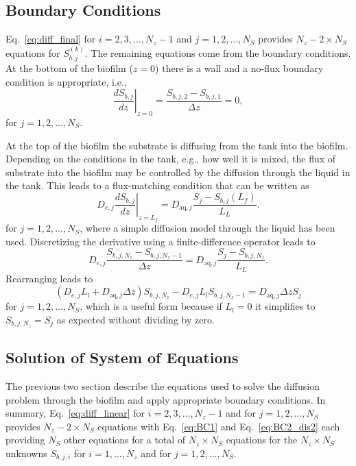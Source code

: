\documentclass[letterpaper, twoside]{article}
\numberwithin{equation}{section}
\newcommand{\eg}{e.g.}
\newcommand{\ie}{i.e.}
\begin{document}
\subsection{Boundary Conditions} \label{Boundary Conditions}
Eq.~\ref{eq:diff_final} for $i=2,3,\dots,N_z-1$ and $j=1,2,\dots,N_S$ provides $N_z-2 \times N_S$ equations for $S_{b,j}^{(k)}$.  The remaining equations come from the boundary conditions.  At the bottom of the biofilm ($z=0$) there is a wall and a no-flux boundary condition is appropriate, \ie,
\begin{equation}
  \label{eq:BC1}
  \left.\frac{d S_{b,j}}{dz}\right|_{z=0}= \frac{S_{b,j,2} - S_{b,j,1}}{\Delta z} =0,
\end{equation}
for $j=1,2,\dots,N_S$.

At the top of the biofilm the substrate is diffusing from the tank into the biofilm.  Depending on the conditions in the tank, \eg, how well it is mixed, the flux of substrate into the biofilm may be controlled by the diffusion through the liquid in the tank.  This leads to a flux-matching condition that can be written as
\begin{equation}
  \label{eq:BC2}
  D_{e,j} \left.\frac{d S_{b,j}}{dz}\right|_{z=L_f} = D_{\mathrm{aq},j} \frac{S_j - S_{b,j}(L_f)}{L_L}.
\end{equation}
for $j=1,2,\dots,N_S$, where a simple diffusion model through the liquid has been used.  Discretizing the derivative using a finite-difference operator leads to
\begin{equation}
  \label{eq:BC2_dis}
  D_{e,j} \frac{S_{b,j,N_z} - S_{b,j,N_z-1}}{\Delta z} = D_{\mathrm{aq},j} \frac{S_j - S_{b,j,N_z}}{L_L}.
\end{equation}
Rearranging leads to
\begin{equation}
  \label{eq:BC2_dis2}
  \left(D_{e,j} L_l + D_{\mathrm{aq},j} \Delta z\right) S_{b,j,N_z} - D_{e,j} L_l S_{b,j,N_z-1} = D_{\mathrm{aq},j} \Delta z S_j
\end{equation}
for $j=1,2,\dots,N_S$, which is a useful form because if $L_l=0$ it simplifies to $S_{b,j, N_z}=S_j$ as expected without dividing by zero.

\subsection{Solution of System of Equations}
The previous two section describe the equations used to solve the diffusion problem through
the biofilm and apply appropriate boundary conditions.
In summary, Eq.~\ref{eq:diff_linear} for $i=2,3,\dots,N_z-1$ and for $j=1,2,\dots,N_S$ provides $N_z-2 \times N_S$ equations with
Eq.~\ref{eq:BC1} and Eq.~\ref{eq:BC2_dis2} each providing $N_S$ other equations
for a total of $N_z\times N_S$ equations for the $N_z\times N_S$ unknowns $S_{b,j,i}$ for $i=1,\dots,N_z$ and for $j=1,2,\dots,N_S$.
\end{document}
